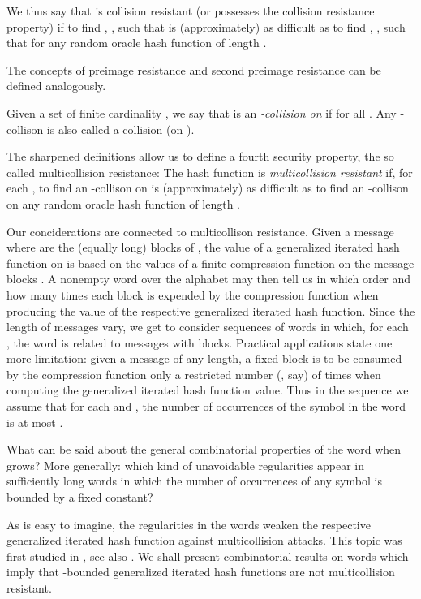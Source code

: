 \documentclass[submission,copyright,creativecommons]{eptcs}
\begin{document}
We thus say that  is collision resistant (or possesses the collision resistance property) if to find , , such that  is (approximately) as difficult as to find , , such that  for any random oracle hash function  of length .

The concepts of preimage resistance and second preimage resistance can be defined analogously. 

Given a set  of finite cardinality , we say that  is an \textit{-collision on } if  for all .  Any -collison is also called a collision (on ). 

The sharpened definitions allow us to define a fourth security property, the so called multicollision resistance: The hash function  is \textit{multicollision resistant} if, for each , to find an -collison on  is (approximately) as difficult as to find an -collison on any random oracle hash function  of length .

Our conciderations are connected to multicollison resistance. Given a message   where  are the (equally long) blocks of , the value of a generalized iterated hash function on  is based on the values of a finite compression function on the message blocks . A nonempty word  over the alphabet  may then tell us in which order and how many times each block  is expended by the compression function when producing the value of the respective generalized iterated hash function. Since the length of messages vary, we get to consider sequences of words  in which, for each , the word  is related to messages with  blocks. Practical applications state one more limitation: given a message of any length, a fixed   block is to be consumed by the compression function only a restricted number (, say) of times when computing the generalized iterated hash function value. Thus in the sequence  we assume that for each  and , the number  of occurrences of the symbol  in the word  is at most . 

What can be said about the general combinatorial properties of the word  when  grows? More generally: which kind of unavoidable regularities appear in sufficiently long words in which the number of occurrences of any symbol is bounded by a fixed constant? 

As is easy to imagine, the regularities in the words  weaken the respective generalized iterated hash function against multicollision attacks. This topic was first studied in \cite{HoS}, see also \cite{Jou,NaS,HKK,KHK,KKH,KKV}. We shall present combinatorial results on words which imply that -bounded generalized iterated hash functions are not multicollision resistant.  
\end{document}

